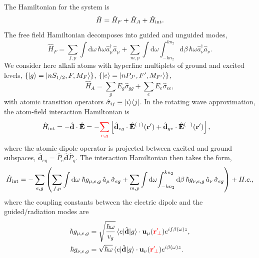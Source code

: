 \documentclass[preprint,aps,pra,onecolumn]{revtex4-1} %
\newcommand{\inter}{{\rm int}}
\newcommand{\error}[1]{{\color{red} #1}}
\begin{document}
The Hamiltonian for the system is
\begin{equation}
\hat{H} = \hat{H}_F+\hat{H}_A + \hat{H}_{\inter}.
\end{equation}
The free field Hamiltonian decomposes into guided and unguided modes, 
	\begin{equation}
		\hat{H}_F = \sum_{f,p}\int \mathrm{d}\omega \, \hbar \omega \hat{a}^\dagger_\mu \hat{a}_\mu 
+\sum_{m,p} \int \mathrm{d}\omega  \int_{-k n_2}^{k n_2} \mathrm{d}\beta \, \hbar \omega 
\hat{a}^\dagger_\nu \hat{a}_\nu.
	\end{equation}
We consider here alkali atoms with hyperfine multiplets of ground and excited levels, $\{ 
\lvert{g}\rangle=\lvert{nS_{1/2}, F, M_F}\rangle\}$, $\{ \lvert{e}\rangle =\lvert{nP_{J'}, F', M_{F'}}\rangle\}$,
	\begin{equation}
		\hat{H}_A  = \sum_g E_g \hat{\sigma}_{gg} + \sum_e E_e \hat{\sigma}_{ee},
	\end{equation}
with atomic transition operators $\hat{\sigma}_{ij} \equiv \lvert{i}\rangle\langle{j}\rvert$.  In the rotating wave approximation, the atom-field interaction Hamiltonian is
	\begin{align}
		\hat{H}_{\inter} &= -\hat{\mathbf{d}}\cdot \hat{\mathbf{E}} =-\error{\sum_{e,g}} \left[ \hat{\mathbf{d}}_{eg}\cdot 
\hat{\mathbf{E}}^{(+)}(\br')+\hat{\mathbf{d}}_{ge}\cdot \hat{\mathbf{E}}^{(-)}(\br') \right],
	\end{align}
where the atomic dipole operator is projected between excited and ground subspaces, $\hat{\mathbf{d}}_{eg}= \hat{P}_e \hat{\mathbf{d}} \hat{P}_g $. The interaction Hamiltonian then takes the form, 
\begin{equation}
	\hat{H}_{\inter} = -\sum_{e,g} \left(\sum_{f,p} \int\mathrm{d}\omega \; \hbar g_{\mu, e,g}\, \hat{a}_\mu  \, 
		\hat{\sigma}_{eg}+ \sum_{m,p} \int\mathrm{d}\omega \! \int_{-kn_2}^{kn_2}\mathrm{d}\beta \,  \hbar 
g_{\nu, e,g}\, \hat{a}_\nu \, \hat{\sigma}_{eg}\right) + {H.c.},
	\end{equation}
where the coupling constants between the electric dipole and the guided/radiation modes are
\begin{subequations} \label{Eq::CouplingConstants}
	\begin{align}
		\hbar g_{\mu, e,g} &= \sqrt{\frac{\hbar \omega}{ v_g  }}\, \bra{e} \hat{\mathbf{d}} \ket{g} 
\cdot\mathbf{u}_\mu ( \error{\br'\!_\perp} ) e^{i f \beta(\omega)z} , \\
		\hbar g_{\nu, e,g} &= \sqrt{  \hbar \omega } \, \bra{e} \hat{\mathbf{d}} \ket{g} \cdot \mathbf{u}_\nu ( \error{ \br'\!_\perp} ) e^{i\beta(\omega)z}  .
	\end{align}
\end{subequations}
\end{document}
